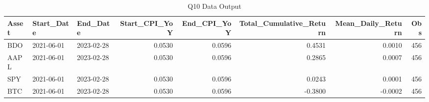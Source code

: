 \begin{table}[H]
\centering
\caption{Q10 Data Output}
\label{tab:q10}
\begin{tabular}{lllrrrrr}
\toprule
Asset & Start\_Date & End\_Date & Start\_CPI\_YoY & End\_CPI\_YoY & Total\_Cumulative\_Return & Mean\_Daily\_Return & Obs \\
\midrule
BDO & 2021-06-01 & 2023-02-28 & 0.0530 & 0.0596 & 0.4531 & 0.0010 & 456 \\
AAPL & 2021-06-01 & 2023-02-28 & 0.0530 & 0.0596 & 0.2865 & 0.0007 & 456 \\
SPY & 2021-06-01 & 2023-02-28 & 0.0530 & 0.0596 & 0.0243 & 0.0001 & 456 \\
BTC & 2021-06-01 & 2023-02-28 & 0.0530 & 0.0596 & -0.3800 & -0.0002 & 456 \\
\bottomrule
\end{tabular}
\end{table}
